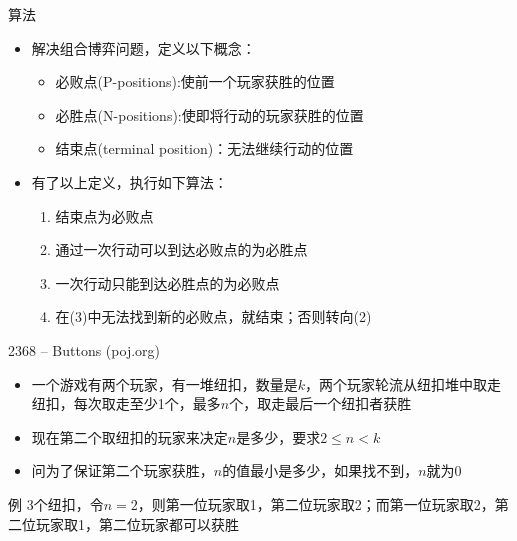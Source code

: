 \begin{frame}{算法}
    \begin{itemize}
        \item 解决组合博弈问题，定义以下概念：
        \begin{itemize}
            \item 必败点(P-positions):使前一个玩家获胜的位置
            \item 必胜点(N-positions):使即将行动的玩家获胜的位置
            \item 结束点(terminal position)：无法继续行动的位置
        \end{itemize}
        \item 有了以上定义，执行如下算法：
        \begin{enumerate}[(1)]
            \item 结束点为必败点
            \item 通过一次行动可以到达必败点的为必胜点
            \item 一次行动只能到达必胜点的为必败点
            \item 在(3)中无法找到新的必败点，就结束；否则转向(2)
        \end{enumerate}
    \end{itemize}
\end{frame}
\begin{frame}{2368 -- Buttons (poj.org)}
    \begin{itemize}
        \item 一个游戏有两个玩家，有一堆纽扣，数量是$k$，两个玩家轮流从纽扣堆中取走纽扣，每次取走至少1个，最多$n$个，取走最后一个纽扣者获胜
        \item 现在第二个取纽扣的玩家来决定$n$是多少，要求$2 \leq n < k$
        \item 问为了保证第二个玩家获胜，$n$的值最小是多少，如果找不到，$n$就为0
    \end{itemize}
    \begin{exampleblock}{例}
        3个纽扣，令$n=2$，则第一位玩家取1，第二位玩家取2；而第一位玩家取2，第二位玩家取1，第二位玩家都可以获胜
    \end{exampleblock}
\end{frame}
